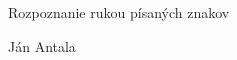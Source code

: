 \begin{center}

  \begin{LARGE}
    \textmd{Rozpoznanie rukou písaných znakov}
  \end{LARGE}

  \vspace*{0.5cm}

  \begin{Large}
  Ján Antala
  \end{Large}  

\end{center}
